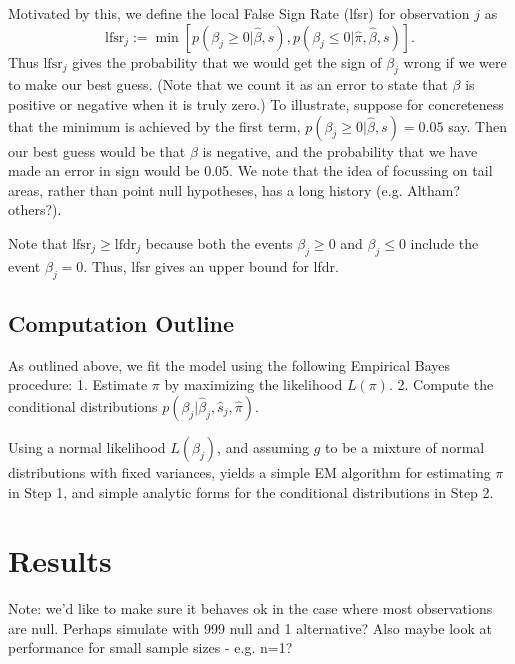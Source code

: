 \documentclass[11pt]{article}
\def\lfsr{\text{lfsr}}
\def\bhat{\hat{\beta}}
\def\shat{\hat{s}}
\begin{document}
Motivated by this, we define the local False Sign Rate (lfsr) for observation $j$ as 
\begin{equation}
\lfsr_j := \min[ p(\beta_j \geq 0| \bhat, s), p(\beta_j \leq 0| \hat\pi, \bhat, s) ].
\end{equation}
Thus $\lfsr_j$ gives the probability that we would get the sign of $\beta_j$ wrong if we
were to make our best guess. (Note that we count it as an error to state that $\beta$ is positive or negative when it is truly zero.)
To illustrate, suppose for concreteness
that the minimum is achieved by the first term, $p(\beta_j \geq 0| \bhat, s)=0.05$ say. Then
our best guess would be that $\beta$ is negative, and the probability that we have
made an error in sign would be 0.05. We note that the idea of focussing on tail areas, rather than point null hypotheses,
has a long history (e.g. Altham? others?).

Note that $\text{lfsr}_j \geq \text{lfdr}_j$ 
because both the events $\beta_j \geq 0$
and $\beta_j \leq 0$ include the event $\beta_j=0$.
Thus, lfsr gives an upper bound for lfdr.






\subsection{Computation Outline}

As outlined above, we fit the model using the following Empirical Bayes procedure:
1. Estimate $\pi$ by maximizing the likelihood $L(\pi)$.
2. Compute the conditional distributions $p(\beta_j | \bhat_j, \shat_j, \hat\pi)$.

Using a normal likelihood $L(\beta_j)$, and assuming
$g$ to be a mixture of normal distributions with fixed variances, 
yields a simple EM algorithm
for estimating $\pi$ in Step 1, and simple analytic forms for the conditional
distributions in Step 2.


\section*{Results}

Note: we'd like to make sure it behaves ok in the case where most observations are null.
Perhaps simulate with 999 null and 1 alternative?
Also maybe look at performance for small sample sizes - e.g. n=1?
\end{document}
